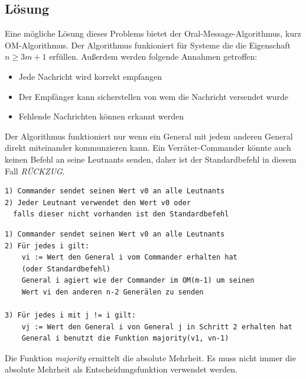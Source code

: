\documentclass{article}
\begin{document}
\iffalse

\subsection{Lösung}

Eine mögliche Lösung dieses Problems bietet der Oral-Message-Algorithmus, kurz OM-Algorithmus. Der
Algorithmus funkioniert für Systeme die die Eigenschaft $n \geq 3m + 1$ erfüllen. Außerdem werden 
folgende Annahmen getroffen: \\

\begin{itemize}
    \item Jede Nachricht wird korrekt empfangen 
    \item Der Empfänger kann sicherstellen von wem die Nachricht versendet wurde 
    \item Fehlende Nachrichten können erkannt werden
\end{itemize}

Der Algorithmus funktioniert nur wenn ein General mit jedem anderen General 
direkt miteinander kommunzieren kann. Ein Verräter-Commander könnte auch 
keinen Befehl an seine Leutnants senden, daher ist der Standardbefehl in diesem 
Fall \textit{RÜCKZUG}.

\begin{lstlisting}[caption=Algorithmus OM(0)]
1) Commander sendet seinen Wert v0 an alle Leutnants
2) Jeder Leutnant verwendet den Wert v0 oder 
  falls dieser nicht vorhanden ist den Standardbefehl
\end{lstlisting}

\medskip

\begin{lstlisting}[caption=Algorithmus OM(m) m > 0]
1) Commander sendet seinen Wert v0 an alle Leutnants
2) Für jedes i gilt:
    vi := Wert den General i vom Commander erhalten hat 
    (oder Standardbefehl)
    General i agiert wie der Commander im OM(m-1) um seinen 
    Wert vi den anderen n-2 Generälen zu senden

3) Für jedes i mit j != i gilt:
    vj := Wert den General i von General j in Schritt 2 erhalten hat
    General i benutzt die Funktion majority(v1, vn-1)
\end{lstlisting}

Die Funktion \textit{majority} ermittelt die absolute Mehrheit. 
Es muss nicht immer die absolute Mehrheit als Entscheidungsfunktion verwendet werden.
\end{document}
